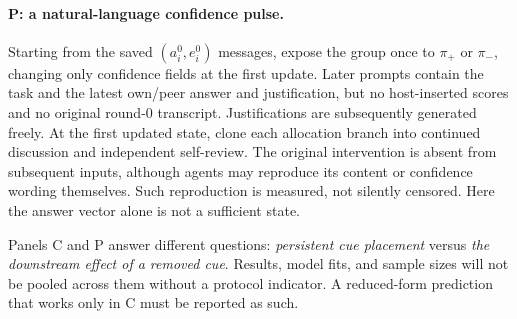 \documentclass[11pt]{article}
\begin{document}
\paragraph{P: a natural-language confidence pulse.}
Starting from the saved $(a_i^0,e_i^0)$ messages, expose the group once to $\pi_+$ or $\pi_-$, changing only confidence fields at the first update. Later prompts contain the task and the latest own/peer answer and justification, but no host-inserted scores and no original round-0 transcript. Justifications are subsequently generated freely. At the first updated state, clone each allocation branch into continued discussion and independent self-review. The original intervention is absent from subsequent inputs, although agents may reproduce its content or confidence wording themselves. Such reproduction is measured, not silently censored. Here the answer vector alone is not a sufficient state.

Panels C and P answer different questions: \emph{persistent cue placement} versus \emph{the downstream effect of a removed cue}. Results, model fits, and sample sizes will not be pooled across them without a protocol indicator. A reduced-form prediction that works only in C must be reported as such.
\end{document}
